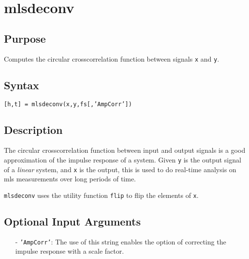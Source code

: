 
\chapter{mlsdeconv} %
\label{cha:mlsdeconv} %

\section{Purpose} %
\label{sec:mlsdeconv_purpose}
Computes the circular crosscorrelation function between signals \texttt{x} and \texttt{y}.


\section{Syntax} %
\label{sec:mlsdeconv_syntax}

\texttt{[h,t] = mlsdeconv(x,y,fs[,'AmpCorr'])}


\section{Description} %
\label{sec:mlsdeconv_description}
The circular crosscorrelation function between input and output signals is a good approximation of the impulse response of a system. Given \texttt{y} is the output signal of a \emph{linear} system, and \texttt{x} is the output, this is used to do real-time analysis on mls measurements over long periods of time.

\texttt{mlsdeconv} uses the utility function \texttt{flip} to flip the elements of \texttt{x}.

\section{Optional Input Arguments} %
\label{sec:mlsdeconv_optional_input_arguments}

\begin{itemize}
	\item[-] \texttt{'AmpCorr'}: The use of this string enables the option of correcting the impulse response with a scale factor.
\end{itemize}

